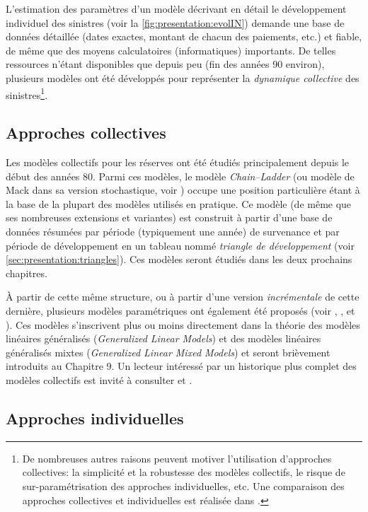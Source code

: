 L'estimation des paramètres d'un modèle décrivant en détail le
développement individuel des sinistres (voir la
\autoref{fig:presentation:evolIN}) demande une base de données
détaillée (dates exactes, montant de chacun des paiements, etc.) et
fiable, de même que des moyens calculatoires (informatiques)
importants. De telles ressources n'étant disponibles que depuis peu
(fin des années 90 environ), plusieurs modèles ont été développés pour
représenter la \emph{dynamique collective} des sinistres\footnote{%
  De nombreuses autres raisons peuvent motiver l'utilisation
  d'approches collectives: la simplicité et la robustesse des modèles
  collectifs, le risque de sur-paramétrisation des approches
  individuelles, etc. Une comparaison des approches collectives et
  individuelles est réalisée dans \cite{Jin2014}.}. %

\subsection{Approches collectives}
\label{sec:presentation:approches:collectives}

Les modèles collectifs pour les réserves ont été étudiés
principalement depuis le début des années 80. Parmi ces modèles, le
modèle \emph{Chain--Ladder} (ou modèle de Mack dans sa version
stochastique, voir \cite{Mack93}) occupe une position particulière
étant à la base de la plupart des modèles utilisés en pratique. Ce
modèle (de même que ses nombreuses extensions et variantes) est
construit à partir d'une base de données résumées par période
(typiquement une année) de survenance et par période de développement
en un tableau nommé \emph{triangle de développement} (voir
\autoref{sec:presentation:triangles}). Ces modèles seront étudiés dans
les deux prochains chapitres.

À partir de cette même structure, ou à partir d'une version
\emph{incrémentale} de cette dernière, plusieurs modèles paramétriques
ont également été proposés (voir \citet{Hertig}, \citet{RV98},
\citet{EV2005} et \citet{Taylorbook}). Ces modèles s'inscrivent plus
ou moins directement dans la théorie des modèles linéaires généralisés
(\emph{Generalized Linear Models}) et des modèles linéaires
généralisés mixtes (\emph{Generalized Linear Mixed Models}) et seront
brièvement introduits au Chapitre 9. Un lecteur intéressé par un
historique plus complet des modèles collectifs est invité à consulter
\citet{WuthrichBook} et \citet{Engl02}.

\subsection{Approches individuelles}
\label{sec:presentation:approches:individuelles}

